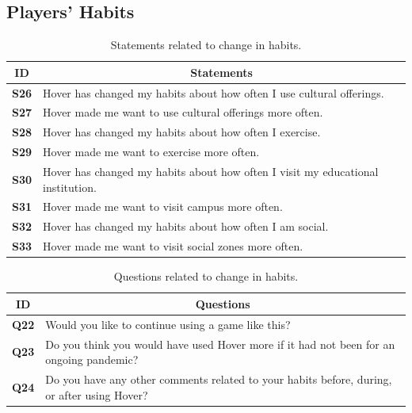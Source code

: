 \subsection*{Players' Habits}
\begin{table}[H]
    \centering
    \begin{tabularx}{\textwidth}{|c|X|}
        \hline
        \textbf{ID} & \multicolumn{1}{c|}{\textbf{Statements}} \\ \hline
        \textbf{S26} & Hover has changed my habits about how often I use cultural offerings. \\
        \textbf{S27} & Hover made me want to use cultural offerings more often.\\
        \textbf{S28} & Hover has changed my habits about how often I exercise. \\
        \textbf{S29} & Hover made me want to exercise more often. \\ 
        \textbf{S30} & Hover has changed my habits about how often I visit my educational institution. \\
        \textbf{S31} & Hover made me want to visit campus more often. \\
        \textbf{S32} & Hover has changed my habits about how often I am social. \\ 
        \textbf{S33} &  Hover made me want to visit social zones more often.\\ \hline
    \end{tabularx}
    \caption{Statements related to change in habits.}
    \label{tab:appendix_player_habits_statements}
\end{table}

\begin{table}[H]
    \centering
    \begin{tabularx}{\textwidth}{|c|X|}
        \hline
        \textbf{ID} & \multicolumn{1}{c|}{\textbf{Questions}} \\ \hline
        \textbf{Q22} & Would you like to continue using a game like this?  \\
        \textbf{Q23} & Do you think you would have used Hover more if it had not been for an ongoing pandemic? \\
        \textbf{Q24} & Do you have any other comments related to your habits before, during, or after using Hover? \\ \hline
    \end{tabularx}
    \caption{Questions related to change in habits.}
    \label{tab:appendix_player_habits_questions}
\end{table}


